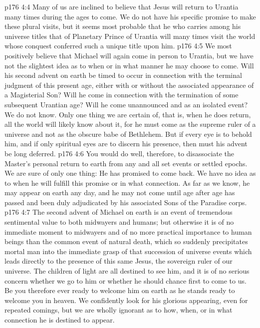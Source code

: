 \vs p176 4:4 Many of us are inclined to believe that Jesus will return to Urantia many times during the ages to come. We do not have his specific promise to make these plural visits, but it seems most probable that he who carries among his universe titles that of Planetary Prince of Urantia will many times visit the world whose conquest conferred such a unique title upon him.
\vs p176 4:5 We most positively believe that Michael will again come in person to Urantia, but we have not the slightest idea as to when or in what manner he may choose to come. Will his second advent on earth be timed to occur in connection with the terminal judgment of this present age, either with or without the associated appearance of a Magisterial Son? Will he come in connection with the termination of some subsequent Urantian age? Will he come unannounced and as an isolated event? We do not know. Only one thing we are certain of, that is, when he does return, all the world will likely know about it, for he must come as the supreme ruler of a universe and not as the obscure babe of Bethlehem. But if every eye is to behold him, and if only spiritual eyes are to discern his presence, then must his advent be long deferred.
\vs p176 4:6 You would do well, therefore, to disassociate the Master’s personal return to earth from any and all set events or settled epochs. We are sure of only one thing: He has promised to come back. We have no idea as to when he will fulfill this promise or in what connection. As far as we know, he may appear on earth any day, and he may not come until age after age has passed and been duly adjudicated by his associated Sons of the Paradise corps.
\vs p176 4:7 The second advent of Michael on earth is an event of tremendous sentimental value to both midwayers and humans; but otherwise it is of no immediate moment to midwayers and of no more practical importance to human beings than the common event of natural death, which so suddenly precipitates mortal man into the immediate grasp of that succession of universe events which leads directly to the presence of this same Jesus, the sovereign ruler of our universe. The children of light are all destined to see him, and it is of no serious concern whether we go to him or whether he should chance first to come to us. Be you therefore ever ready to welcome him on earth as he stands ready to welcome you in heaven. We confidently look for his glorious appearing, even for repeated comings, but we are wholly ignorant as to how, when, or in what connection he is destined to appear.
